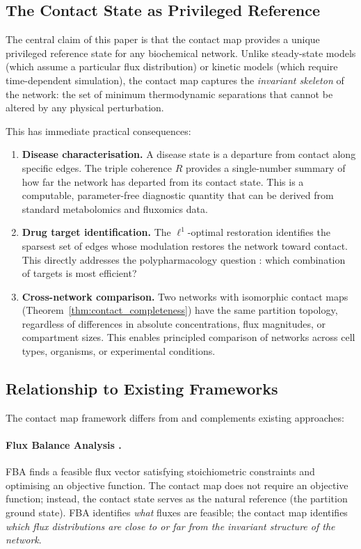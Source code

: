 \documentclass[11pt,twocolumn]{article}
\theoremstyle{plain}
\theoremstyle{definition}
\begin{document}
\subsection{The Contact State as Privileged Reference}

The central claim of this paper is that the contact map provides a unique
privileged reference state for any biochemical network. Unlike steady-state
models (which assume a particular flux distribution) or kinetic models
(which require time-dependent simulation), the contact map captures the
\emph{invariant skeleton} of the network: the set of minimum thermodynamic
separations that cannot be altered by any physical perturbation.

This has immediate practical consequences:

\begin{enumerate}[label=(\roman*)]
\item \textbf{Disease characterisation.} A disease state is a departure from
  contact along specific edges. The triple coherence $R$ provides a
  single-number summary of how far the network has departed from its contact
  state. This is a computable, parameter-free diagnostic quantity that can be
  derived from standard metabolomics and fluxomics data.

\item \textbf{Drug target identification.} The $\ell^1$-optimal restoration
  identifies the sparsest set of edges whose modulation restores the network
  toward contact. This directly addresses the polypharmacology question
  \cite{hopkins2008network}: which combination of targets is most efficient?

\item \textbf{Cross-network comparison.} Two networks with isomorphic contact
  maps (Theorem~\ref{thm:contact_completeness}) have the same partition
  topology, regardless of differences in absolute concentrations, flux
  magnitudes, or compartment sizes. This enables principled comparison of
  networks across cell types, organisms, or experimental conditions.
\end{enumerate}

\subsection{Relationship to Existing Frameworks}

The contact map framework differs from and complements existing approaches:

\paragraph{Flux Balance Analysis \cite{orth2010flux}.}
FBA finds a feasible flux vector satisfying stoichiometric constraints and
optimising an objective function. The contact map does not require an objective
function; instead, the contact state serves as the natural reference (the
partition ground state). FBA identifies \emph{what} fluxes are feasible; the
contact map identifies \emph{which flux distributions are close to or far from
the invariant structure of the network}.
\end{document}
